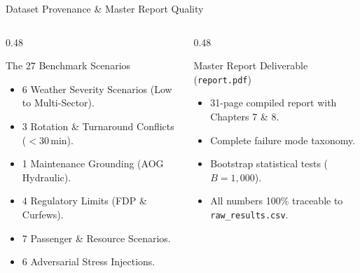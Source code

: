 \documentclass[aspectratio=169,10pt]{beamer}
\begin{document}
\begin{frame}{Dataset Provenance \& Master Report Quality}
  \begin{columns}[t]
    \begin{column}{0.48\textwidth}
      \begin{block}{The 27 Benchmark Scenarios}
        \begin{itemize}\footnotesize
          \item 6 Weather Severity Scenarios (Low to Multi-Sector).
          \item 3 Rotation \& Turnaround Conflicts ($<30\,$min).
          \item 1 Maintenance Grounding (AOG Hydraulic).
          \item 4 Regulatory Limits (FDP \& Curfews).
          \item 7 Passenger \& Resource Scenarios.
          \item 6 Adversarial Stress Injections.
        \end{itemize}
      \end{block}
    \end{column}
    \begin{column}{0.48\textwidth}
      \begin{block}{Master Report Deliverable (\texttt{report.pdf})}
        \begin{itemize}\footnotesize
          \item 31-page compiled report with Chapters 7 \& 8.
          \item Complete failure mode taxonomy.
          \item Bootstrap statistical tests ($B=1,000$).
          \item All numbers 100\% traceable to \texttt{raw\_results.csv}.
        \end{itemize}
      \end{block}
    \end{column}
  \end{columns}
\end{frame}
\end{document}
